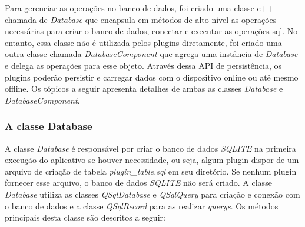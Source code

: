 Para gerenciar as operações no banco de dados, foi criado uma classe c++ chamada de \textit{Database} que encapsula em métodos de alto nível as operações necessárias para criar o banco de dados, conectar e executar as operações sql. No entanto, essa classe não é utilizada pelos plugins diretamente, foi criado uma outra classe chamada \textit{DatabaseComponent} que agrega uma instância de \textit{Database} e delega as operações para esse objeto. Através dessa API de persistência, os plugins poderão persistir e carregar dados com o dispositivo online ou até mesmo offline. Os tópicos a seguir apresenta detalhes de ambas as classes \textit{Database} e \textit{DatabaseComponent}.


\subsubsection{A classe Database}\label{sec:solucao-desenvolvida}
A classe \textit{Database} é responsável por criar o banco de dados \textit{SQLITE} na primeira execução do aplicativo se houver necessidade, ou seja, algum plugin dispor de um arquivo de criação de tabela \textit{plugin\_table.sql} em seu diretório. Se nenhum plugin fornecer esse arquivo, o banco de dados \textit{SQLITE} não será criado. A classe \textit{Database} utiliza as classes \textit{QSqlDatabase} e \textit{QSqlQuery} para criação e conexão com o banco de dados e a classe \textit{QSqlRecord} para as realizar \textit{querys}. Os métodos principais desta classe são descritos a seguir:

